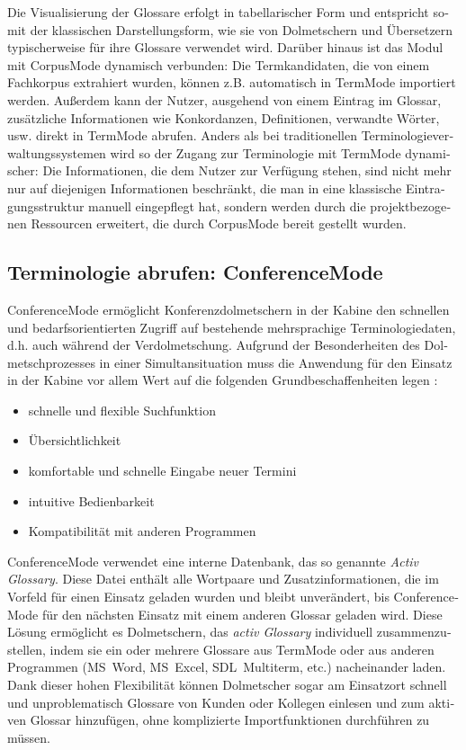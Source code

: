 \documentclass[output=paper]{LSP/langsci}
\begin{document}
\begin{otherlanguage}{ngerman}
\largerpage
Die Visualisierung der Glossare erfolgt in tabellarischer Form und entspricht somit der klassischen Darstellungsform, wie sie von Dolmetschern und Übersetzern typischerweise für ihre Glossare verwendet wird. Darüber hinaus ist das Modul mit CorpusMode dynamisch verbunden: Die Termkandidaten, die von einem Fachkorpus extrahiert wurden, können z.B. automatisch in TermMode importiert werden. Außerdem kann der Nutzer, ausgehend von einem Eintrag im Glossar, zusätzliche Informationen wie Konkordanzen, Definitionen, verwandte Wörter, usw. direkt in TermMode abrufen. Anders als bei traditionellen Terminologieverwaltungssystemen wird so der Zugang zur Terminologie mit TermMode dynamischer: Die Informationen, die dem Nutzer zur Verfügung stehen, sind nicht mehr nur auf diejenigen Informationen beschränkt, die man in eine klassische Eintragungsstruktur manuell eingepflegt hat, sondern werden durch die projektbezogenen Ressourcen erweitert, die durch CorpusMode bereit gestellt wurden. 

\subsection{Terminologie abrufen: ConferenceMode}\label{sec:fantinuoli:6.3}

ConferenceMode ermöglicht Konferenzdolmetschern in der Kabine den schnellen und bedarfsorientierten Zugriff auf bestehende mehrsprachige Terminologiedaten, d.h. auch während der Verdolmetschung. Aufgrund der Besonderheiten des Dolmetschprozesses in einer Simultansituation muss die Anwendung für den Einsatz in der Kabine vor allem Wert auf die folgenden Grundbeschaffenheiten legen \citep{SDI2007}:

\begin{itemize}
\item  
schnelle und flexible Suchfunktion 
\item  
Übersichtlichkeit 
\item  
komfortable und schnelle Eingabe neuer Termini 
\item  
intuitive Bedienbarkeit 
\item  
Kompatibilität mit anderen Programmen 
\end{itemize}

\newpage 
ConferenceMode verwendet eine interne Datenbank, das so genannte \textit{Activ Glossary}. Diese Datei enthält alle Wortpaare und Zusatzinformationen, die im Vorfeld für einen Einsatz geladen wurden und bleibt unverändert, bis ConferenceMode für den nächsten Einsatz mit einem anderen Glossar geladen wird. Diese Lösung ermöglicht es Dolmetschern, das \textit{activ Glossary} individuell zusammenzustellen, indem sie ein oder mehrere Glossare aus TermMode oder aus anderen Programmen (MS~Word, MS~Excel, SDL~Multiterm, etc.) nacheinander laden. Dank dieser hohen Flexibilität können Dolmetscher sogar am Einsatzort schnell und unproblematisch Glossare von Kunden oder Kollegen einlesen und zum aktiven Glossar hinzufügen, ohne komplizierte Importfunktionen durchführen zu müssen. 


\end{otherlanguage}
\end{document}
